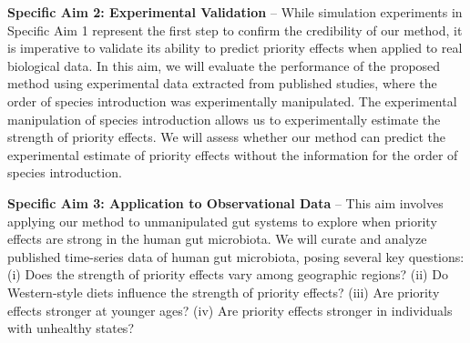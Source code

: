 \documentclass[12pt, class=article, crop=false]{standalone}
\begin{document}
\textbf{Specific Aim 2: Experimental Validation} --
While simulation experiments in Specific Aim 1 represent the first step to confirm the credibility of our method, it is imperative to validate its ability to predict priority effects when applied to real biological data.
In this aim, we will evaluate the performance of the proposed method using experimental data extracted from published studies, where the order of species introduction was experimentally manipulated.
The experimental manipulation of species introduction allows us to experimentally estimate the strength of priority effects.
We will assess whether our method can predict the experimental estimate of priority effects without the information for the order of species introduction.

\textbf{Specific Aim 3: Application to Observational Data} --
This aim involves applying our method to unmanipulated gut systems to explore when priority effects are strong in the human gut microbiota.
We will curate and analyze published time-series data of human gut microbiota, posing several key questions:
(i) Does the strength of priority effects vary among geographic regions?
(ii) Do Western-style diets influence the strength of priority effects?
(iii) Are priority effects stronger at younger ages?
(iv) Are priority effects stronger in individuals with unhealthy states?
\end{document}
